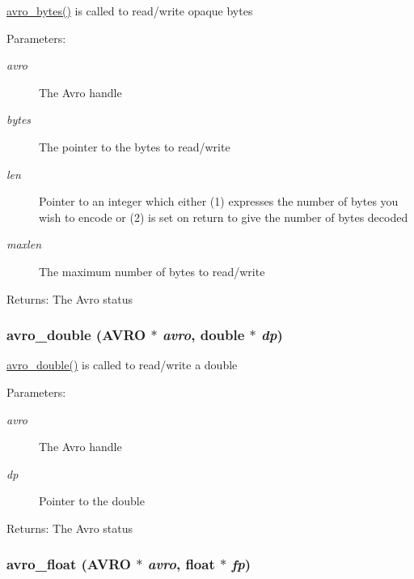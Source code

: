\hyperlink{group___primitives_g883aa71b77043b51296ab278c2a84a23}{avro\_\-bytes()} is called to read/write opaque bytes \begin{Desc}
\item[Parameters:]
\begin{description}
\item[{\em avro}]The Avro handle \item[{\em bytes}]The pointer to the bytes to read/write \item[{\em len}]Pointer to an integer which either (1) expresses the number of bytes you wish to encode or (2) is set on return to give the number of bytes decoded \item[{\em maxlen}]The maximum number of bytes to read/write \end{description}
\end{Desc}
\begin{Desc}
\item[Returns:]The Avro status \end{Desc}
\hypertarget{group___primitives_g16c546852402edffa666a3cd214d4f7c}{
\subsubsection[{avro\_\-double}]{ avro\_\-double ({\bf AVRO} $\ast$ {\em avro}, \/  double $\ast$ {\em dp})}}
\label{group___primitives_g16c546852402edffa666a3cd214d4f7c}


\hyperlink{group___primitives_g16c546852402edffa666a3cd214d4f7c}{avro\_\-double()} is called to read/write a double \begin{Desc}
\item[Parameters:]
\begin{description}
\item[{\em avro}]The Avro handle \item[{\em dp}]Pointer to the double \end{description}
\end{Desc}
\begin{Desc}
\item[Returns:]The Avro status \end{Desc}
\hypertarget{group___primitives_ge1346e273aa3d82cc324992f081c6a49}{
\subsubsection[{avro\_\-float}]{ avro\_\-float ({\bf AVRO} $\ast$ {\em avro}, \/  float $\ast$ {\em fp})}}
\label{group___primitives_ge1346e273aa3d82cc324992f081c6a49}



